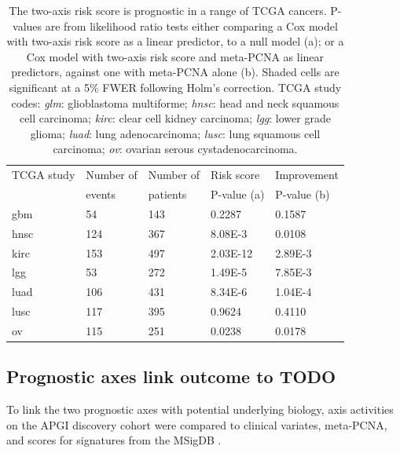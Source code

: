 \documentclass[dissertation.tex]{subfiles}
\begin{document}
\begin{table}[h]
\caption{The two-axis risk score is prognostic in a range of \acrshort{TCGA} cancers.  P-values are from likelihood ratio tests either comparing a Cox model with two-axis risk score as a linear predictor, to a null model (a); or a Cox model with two-axis risk score and meta-PCNA as linear predictors, against one with meta-PCNA alone (b).  Shaded cells are significant at a 5\% \gls{FWER} following Holm's correction.  \acrshort{TCGA} study codes: \emph{glm}: glioblastoma multiforme; \emph{hnsc}: head and neck squamous cell carcinoma; \emph{kirc}: clear cell kidney carcinoma; \emph{lgg}: lower grade glioma; \emph{luad}: lung adenocarcinoma; \emph{lusc}: lung squamous cell carcinoma; \emph{ov}: ovarian serous cystadenocarcinoma.\label{tab:sigs-validation-tcga}}
\center
\begin{tabular}{@{}lllll@{}}
\toprule
TCGA study & Number of & Number of & Risk score  & Improvement \\
           & events    & patients  & P-value (a) & P-value (b) \\ \midrule
gbm    & 54   & 143    & 0.2287                           & 0.1587                           \\
hnsc   & 124  & 367    & \cellcolor[HTML]{C0C0C0}8.08E-3  & 0.0108                           \\
kirc   & 153  & 497    & \cellcolor[HTML]{C0C0C0}2.03E-12 & \cellcolor[HTML]{C0C0C0}2.89E-3  \\
lgg    & 53   & 272    & \cellcolor[HTML]{C0C0C0}1.49E-5  & \cellcolor[HTML]{C0C0C0}7.85E-3  \\
luad   & 106  & 431    & \cellcolor[HTML]{C0C0C0}8.34E-6  & \cellcolor[HTML]{C0C0C0}1.04E-4  \\
lusc   & 117  & 395    & 0.9624                           & 0.4110                           \\
ov     & 115  & 251    & 0.0238                           & 0.0178                           \\ \bottomrule
\end{tabular}
\end{table}


\subsection{Prognostic axes link outcome to TODO}
To link the two prognostic axes with potential underlying biology, axis activities on the \gls{APGI} discovery cohort were compared to clinical variates, meta-PCNA, and scores for signatures from the \gls{MSigDB} \cite{Subramanian2005}.
\end{document}
